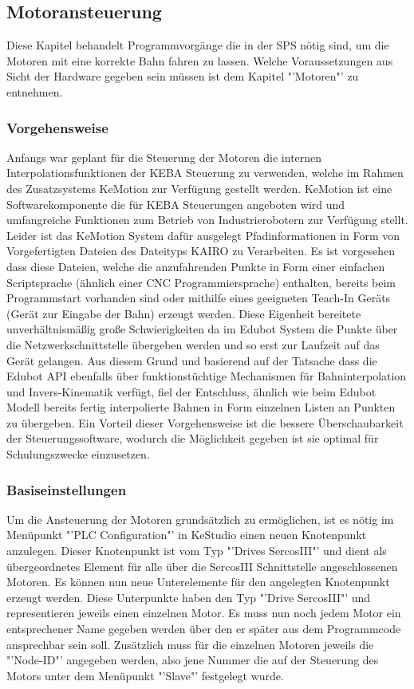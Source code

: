 \subsection{Motoransteuerung}
Diese Kapitel behandelt Programmvorgänge die in der SPS nötig sind, um die Motoren mit eine korrekte Bahn fahren zu lassen. Welche Voraussetzungen aus Sicht der Hardware gegeben sein müssen ist dem Kapitel "'Motoren"' zu entnehmen.

\subsubsection{Vorgehensweise}
Anfangs war geplant für die Steuerung der Motoren die internen Interpolationsfunktionen der KEBA Steuerung zu verwenden, welche im Rahmen des Zusatzsystems KeMotion zur Verfügung gestellt werden. KeMotion ist eine Softwarekomponente die für KEBA Steuerungen angeboten wird und umfangreiche Funktionen zum Betrieb von Industrierobotern zur Verfügung stellt.
Leider ist das KeMotion System dafür ausgelegt Pfadinformationen in Form von Vorgefertigten Dateien des Dateityps KAIRO zu Verarbeiten. Es ist vorgesehen dass diese Dateien, welche die anzufahrenden Punkte in Form einer einfachen Scriptsprache (ähnlich einer CNC Programmiersprache) enthalten, bereits beim Programmstart vorhanden sind oder mithilfe eines geeigneten Teach-In Geräts (Gerät zur Eingabe der Bahn) erzeugt werden. Diese Eigenheit bereitete unverhältnismäßig große Schwierigkeiten da im Edubot System die Punkte über die Netzwerkschnittstelle übergeben werden und so erst zur Laufzeit auf das Gerät gelangen. 
Aus diesem Grund und basierend auf der Tatsache dass die Edubot API ebenfalls über funktionstüchtige Mechanismen für Bahninterpolation und Invers-Kinematik verfügt, fiel der Entschluss, ähnlich wie beim Edubot Modell bereits fertig interpolierte Bahnen in Form einzelnen Listen an Punkten zu übergeben. Ein Vorteil dieser Vorgehensweise ist die bessere Überschaubarkeit der Steuerungssoftware, wodurch die Möglichkeit gegeben ist sie optimal für Schulungszwecke einzusetzen.

\subsubsection{Basiseinstellungen}
Um die Ansteuerung der Motoren grundsätzlich zu ermöglichen, ist es nötig im Menüpunkt "'PLC Configuration"' in KeStudio einen neuen Knotenpunkt anzulegen. Dieser Knotenpunkt ist vom Typ "'Drives SercosIII"' und dient als übergeordnetes Element für alle über die SercosIII Schnittstelle angeschlossenen Motoren. 
Es können nun neue Unterelemente für den angelegten Knotenpunkt erzeugt werden. Diese Unterpunkte haben den Typ "'Drive SercosIII"' und representieren jeweils einen einzelnen Motor. Es muss nun noch jedem Motor ein entsprechener Name gegeben werden über den er später aus dem Programmcode ansprechbar sein soll. Zusätzlich muss für die einzelnen Motoren jeweils die "'Node-ID"' angegeben werden, also jene Nummer die auf der Steuerung des Motors unter dem Menüpunkt "'Slave"' festgelegt wurde.

